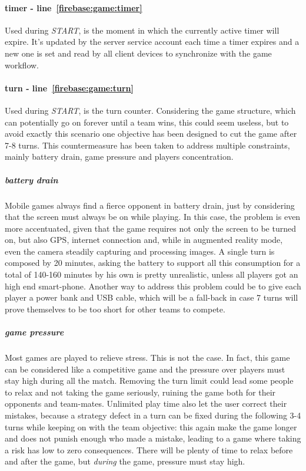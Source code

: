 				\paragraph{timer - line~\ref{firebase:game:timer}}
				Used during \emph{START}, is the moment in which the currently active timer will expire. It's updated by the server service account each time a timer expires and a new one is set and read by all client devices to synchronize with the game workflow.
				
				\paragraph{turn - line~\ref{firebase:game:turn}}
				Used during \emph{START}, is the turn counter. Considering the game structure, which can potentially go on forever until a team wins, this could seem useless, but to avoid exactly this scenario one objective has been designed to cut the game after 7-8 turns.
				This countermeasure has been taken to address multiple constraints, mainly battery drain, game pressure and players concentration.
				
				\subparagraph{battery drain}
				Mobile games always find a fierce opponent in battery drain, just by considering that the screen must always be on while playing.
				In this case, the problem is even more accentuated, given that the game requires not only the screen to be turned on, but also GPS, internet connection and, while in augmented reality mode, even the camera steadily capturing and processing images.
				A single turn is composed by 20 minutes, asking the battery to support all this consumption for a total of 140-160 minutes by his own is pretty unrealistic, unless all players got an high end smart-phone.
				Another way to address this problem could be to give each player a power bank and USB cable, which will be a fall-back in case 7 turns will prove themselves to be too short for other teams to compete.
				
				\subparagraph{game pressure}
				Most games are played to relieve stress. This is not the case. In fact, this game can be considered like a competitive game and the pressure over players must stay high during all the match. Removing the turn limit could lead some people to relax and not taking the game seriously, ruining the game both for their opponents and team-mates.
				Unlimited play time also let the user correct their mistakes, because a strategy defect in a turn can be fixed during the following 3-4 turns while keeping on with the team objective: this again make the game longer and does not punish enough who made a mistake, leading to a game where taking a risk has low to zero consequences.
				There will be plenty of time to relax before and after the game, but \emph{during} the game, pressure must stay high.
				
